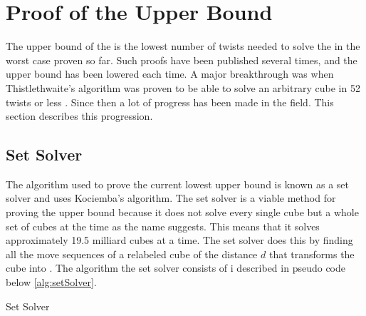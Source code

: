 \chapter{Proof of the Upper Bound}
The upper bound of the \rubik{} is the lowest number of twists needed to solve the \rubik{} in the worst case proven so far. Such proofs have been published several times, and the upper bound has been lowered each time. A major breakthrough was when Thistlethwaite's algorithm was proven to be able to solve an arbitrary cube in 52 twists or less \cite{jaapthistle}. Since then a lot of progress has been made in the field. This section describes this progression.

\section{Set Solver}
The algorithm used to prove the current lowest upper bound is known as a set solver and uses Kociemba's algorithm. The set solver is a viable method for proving the upper bound because it does not solve every single cube but a whole set of cubes at the time as the name suggests. This means that it solves approximately 19.5 milliard cubes at a time.
The set solver does this by finding all the move sequences of a relabeled cube of the distance $d$ that transforms the cube into . 
The algorithm the set solver consists of i described in pseudo code below \ref{alg:setSolver}.%

\begin{algorithm}[!h]                     
\caption{Set Solver \cite{rokicki09}}          
\label{alg:setSolver}        
\begin{algorithmic}[1]
				\ENDIF
			\ENDFOR
		\ENDIF
		\ENDIF
	\ENDIF
\ENDWHILE
\end{algorithmic}
\end{algorithm}

